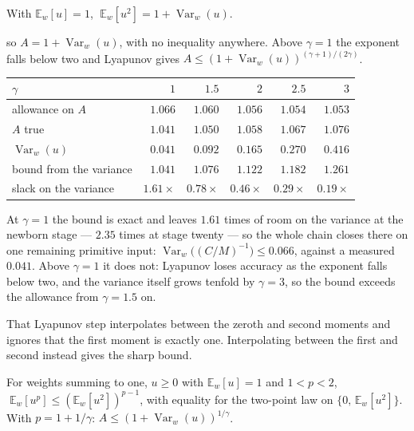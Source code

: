 \begin{proposition}\label{prop:gradvar}
With $\mathbb E_w[u]=1$, $\;\mathbb E_w[u^2]=1+\operatorname{Var}_w(u)$.
\end{proposition}

so $A=1+\operatorname{Var}_w(u)$, with no inequality anywhere. Above $\gamma=1$ the exponent falls
below two and Lyapunov gives $A\le(1+\operatorname{Var}_w(u))^{(\gamma+1)/(2\gamma)}$.

\begin{center}
\begin{tabular}{lrrrrr}
\toprule
$\gamma$ & $1$ & $1.5$ & $2$ & $2.5$ & $3$\\
\midrule
allowance on $A$ & $1.066$ & $1.060$ & $1.056$ & $1.054$ & $1.053$\\
$A$ true & $1.041$ & $1.050$ & $1.058$ & $1.067$ & $1.076$\\
$\operatorname{Var}_w(u)$ & $0.041$ & $0.092$ & $0.165$ & $0.270$ & $0.416$\\
bound from the variance & $\mathbf{1.041}$ & $1.076$ & $1.122$ & $1.182$ & $1.261$\\
slack on the variance & $\mathbf{1.61\times}$ & $0.78\times$ & $0.46\times$ & $0.29\times$ & $0.19\times$\\
\bottomrule
\end{tabular}
\end{center}

At $\gamma=1$ the bound is exact and leaves $1.61$ times of room on the variance at the newborn stage
--- $2.35$ times at stage twenty --- so the whole chain closes there on one remaining primitive input:
$\operatorname{Var}_w\bigl((C/M)^{-1}\bigr)\le0.066$, against a measured $0.041$. Above $\gamma=1$ it
does not: Lyapunov loses accuracy as the exponent falls below two, and the variance itself grows
tenfold by $\gamma=3$, so the bound exceeds the allowance from $\gamma=1.5$ on.

That Lyapunov step interpolates between the zeroth and second moments and ignores that the first
moment is exactly one. Interpolating between the first and second instead gives the sharp bound.

\begin{proposition}\label{prop:sharpmom}
For weights summing to one, $u\ge0$ with $\mathbb E_w[u]=1$ and $1<p<2$,
$\;\mathbb E_w[u^p]\le(\mathbb E_w[u^2])^{p-1}$, with equality for the two-point law on
$\{0,\,\mathbb E_w[u^2]\}$. With $p=1+1/\gamma$: $A\le(1+\operatorname{Var}_w(u))^{1/\gamma}$.
\end{proposition}

